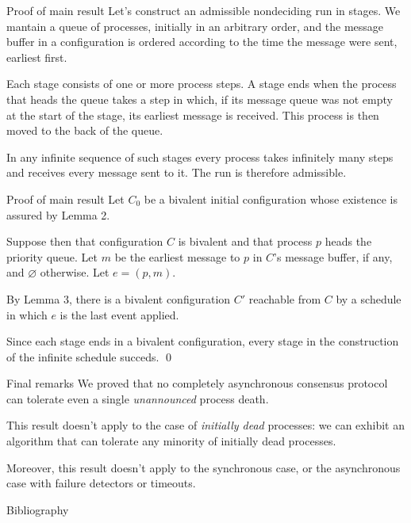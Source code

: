 \documentclass[12pt]{beamer}
\begin{document}
  \begin{frame}{Proof of main result}
    Let's construct an admissible nondeciding run in stages. We mantain a queue
    of processes, initially in an arbitrary order, and the message buffer in a
    configuration is ordered according to the time the message were sent,
    earliest first.

    \pause\vspace{0.25cm}

    Each stage consists of one or more process steps. A stage ends when the
    process that heads the queue takes a step in which, if its message queue
    was not empty at the start of the stage, its earliest message is received.
    This process is then moved to the back of the queue.

    \pause\vspace{0.25cm}

    In any infinite sequence of such stages every process takes infinitely many
    steps and receives every message sent to it. The run is therefore
    admissible.
  \end{frame}

  \begin{frame}{Proof of main result}
    Let \(C_0\) be a bivalent initial configuration whose existence is assured
    by Lemma 2.

    \pause\vspace{0.25cm}

    Suppose then that configuration \(C\) is bivalent and that process \(p\)
    heads the priority queue. Let \(m\) be the earliest message to \(p\) in
    \(C\)'s message buffer, if any, and \(\varnothing\) otherwise. Let \(e =
    (p, m)\).

    \pause\vspace{0.25cm}

    By Lemma 3, there is a bivalent configuration \(C'\) reachable from \(C\)
    by a schedule in which \(e\) is the last event applied.

    \pause\vspace{0.25cm}

    Since each stage ends in a bivalent configuration, every stage in the
    construction of the infinite schedule succeds. \qed
  \end{frame}

  \begin{frame}{Final remarks}
    We proved that no completely asynchronous consensus protocol can tolerate
    even a single \emph{unannounced} process death.

    \vspace{0.25cm}

    This result doesn't apply to the case of \emph{initially dead} processes:
    we can exhibit an algorithm that can tolerate any minority of initially
    dead processes.

    \vspace{0.25cm}

    Moreover, this result doesn't apply to the synchronous case, or the
    asynchronous case with failure detectors or timeouts.
  \end{frame}

  \begin{frame}{Bibliography}
    
  \end{frame}
\end{document}
